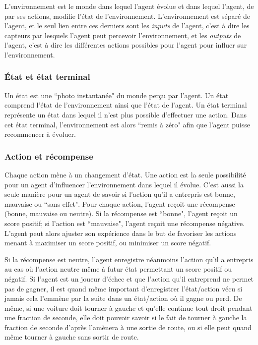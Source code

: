 \documentclass[11pt,a4paper]{report}
\begin{document}
    \par L'environnement est le monde dans lequel l'agent évolue et dans lequel l'agent, de par ses actions, modifie l'état de l'environnement. L'environnement est séparé de l'agent, et le seul lien entre ces derniers sont les \textit{inputs} de l'agent, c'est à dire les capteurs par lesquels l'agent peut percevoir l'environnement, et les \textit{outputs} de l'agent, c'est à dire les différentes actions possibles pour l'agent pour influer sur l'environnement. 
    
  \subsubsection{État et état terminal}
  
    \par Un état est une ``photo instantanée" du monde perçu par l'agent. Un état comprend l'état de l'environnement ainsi que l'état de l'agent. Un état terminal représente un état dans lequel il n'est plus possible d'effectuer une action. Dans cet état terminal, l'environnement est alors ``remis à zéro" afin que l'agent puisse recommencer à évoluer. 
  
   \subsubsection{Action et récompense}
  
    \par Chaque action mène à un changement d'état. Une action est la seule possibilité pour un agent d'influencer l'environnement dans lequel il évolue. C'est aussi la seule manière pour un agent de savoir si l'action qu'il a entrepris est bonne, mauvaise ou ``sans effet". Pour chaque action, l'agent reçoit une récompense (bonne, mauvaise ou neutre). Si la récompense est ``bonne", l'agent reçoit un score positif; si l'action est ``mauvaise", l'agent reçoit une récompense négative. L'agent peut alors ajuster son expérience dans le but de favoriser les actions menant à maximiser un score positif, ou minimiser un score négatif.
    
    \par Si la récompense est neutre, l'agent enregistre néanmoins l'action qu'il a entrepris au cas où l'action neutre même à futur état permettant un score positif ou négatif. Si l'agent est un joueur d'échec et que l'action qu'il entreprend ne permet pas de gagner, il est quand même important d'enregistrer l'état/action vécu si jamais cela l’emmène par la suite dans un état/action où il gagne ou perd. De même, si une voiture doit tourner à gauche et qu'elle continue tout droit pendant une fraction de seconde, elle doit pouvoir savoir si le fait de tourner à gauche la fraction de seconde d'après l'amènera à une sortie de route, ou si elle peut quand même tourner à gauche sans sortir de route. 
    
\end{document}
